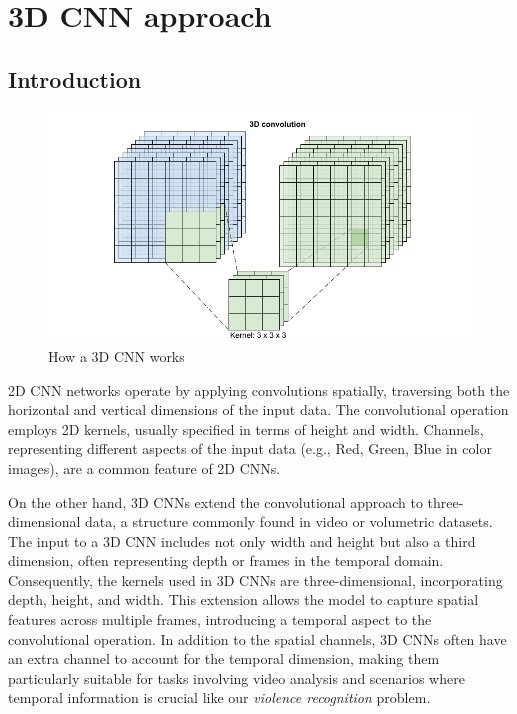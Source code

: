\chapter{3D CNN approach}
\label{chapter:3D}
\section{Introduction}
\begin{figure}[h]
    \centering
    \includegraphics[width=\textwidth]{./images/3DCNN.png}
    \caption{How a 3D CNN works}
    \label{fig:How3DCNNWorks}
\end{figure}

2D CNN networks operate by applying convolutions spatially, traversing both the horizontal and vertical dimensions of the input data. The convolutional operation employs 2D kernels, usually specified in terms of height and width. Channels, representing different aspects of the input data (e.g., Red, Green, Blue in color images), are a common feature of 2D CNNs.

On the other hand, 3D CNNs extend the convolutional approach to three-dimensional data, a structure commonly found in video or volumetric datasets. The input to a 3D CNN includes not only width and height but also a third dimension, often representing depth or frames in the temporal domain. Consequently, the kernels used in 3D CNNs are three-dimensional, incorporating depth, height, and width. This extension allows the model to capture spatial features across multiple frames, introducing a temporal aspect to the convolutional operation. In addition to the spatial channels, 3D CNNs often have an extra channel to account for the temporal dimension, making them particularly suitable for tasks involving video analysis and scenarios where temporal information is crucial like our \textit{violence recognition} problem.

